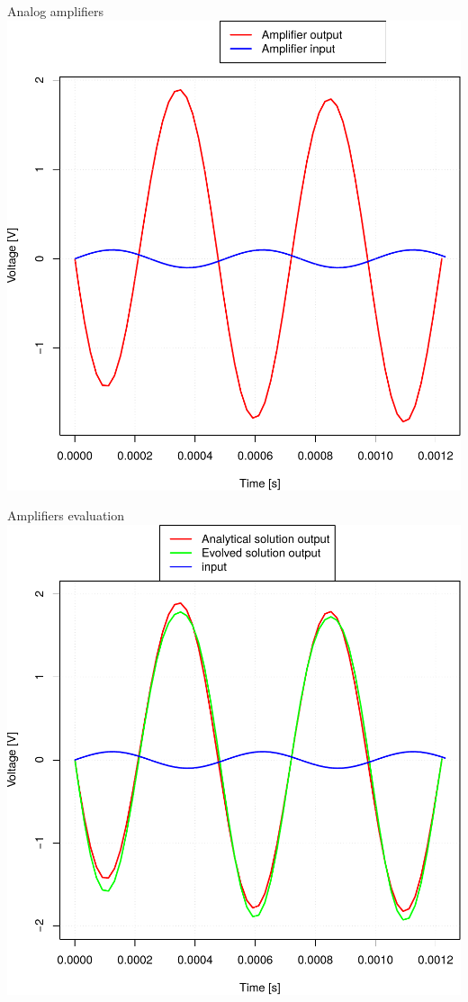 \documentclass[10pt,xcolor=pdflatex]{beamer}
\begin{document}
\begin{frame}{Analog amplifiers}
    \centering
    \includegraphics[scale=.45]{ce-amplifier-sim}
\end{frame}

\begin{frame}{Amplifiers evaluation}
    \centering
    \includegraphics[scale=.45]{best-match}
\end{frame}
\end{document}
